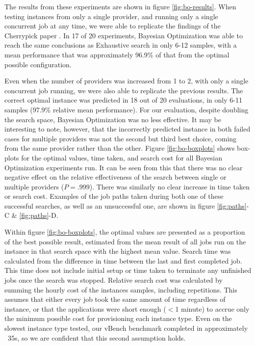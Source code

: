 \documentclass{report}
\begin{document}
The results from these experiments are shown in figure \ref{fig:bo-results}. When testing instances from only a single provider, and running only a single concurrent job at any time, we were able to replicate the findings of the Cherrypick paper \cite{Alipourfard2017}. In 17 of 20 experiments, Bayesian Optimization was able to reach the same conclusions as Exhaustive search in only 6-12 samples, with a mean performance that was approximately 96.9\% of that from the optimal possible configuration. 

Even when the number of providers was increased from 1 to 2, with only a single concurrent job running, we were also able to replicate the previous results. The correct optimal instance was predicted in 18 out of 20 evaluations, in only 6-11 samples (97.9\% relative mean performance). For our evaluation, despite doubling the search space, Bayesian Optimization was no less effective.  It may be interesting to note, however, that the incorrectly predicted instance in both failed cases for multiple providers was not the second but third best choice, coming from the same provider rather than the other.  Figure \ref{fig:bo-boxplots} shows box-plots for the optimal values, time taken, and search cost for all Bayesian Optimization experiments run. It can be seen from this that there was no clear negative effect on the relative effectiveness of the search between single or multiple providers ($ P = .999 $). There was similarly no clear increase in time taken or search cost. Examples of the job paths taken during both one of these successful searches, as well as an unsuccessful one, are shown in figure \ref{fig:paths}-C \& \ref{fig:paths}-D. 

Within figure \ref{fig:bo-boxplots}, the optimal values are presented as a proportion of the best possible result, estimated from the mean result of all jobs run on the instance in that search space with the highest mean value. Search time was calculated from the difference in time between the last and first completed job. This time does not include initial setup or time taken to terminate any unfinished jobs once the search was stopped. Relative search cost was calculated by summing the hourly cost of the instances samples, including repetitions. This assumes that either every job took the same amount of time regardless of instance, or that the applications were short enough ($<$1 minute) to accrue only the minimum possible cost for provisioning each instance type. Even on the slowest instance type tested, our vBench benchmark completed in approximately ~35s, so we are confident that this second assumption holds.
\end{document}
